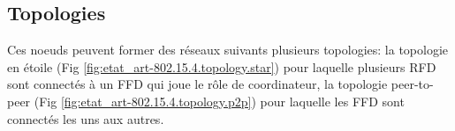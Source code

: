 \subsection{Topologies}\label{subsec:etat_art-802.15.4.topologies}
  Ces noeuds peuvent former des réseaux suivants plusieurs topologies: la topologie en étoile (Fig
  \ref{fig:etat_art-802.15.4.topology.star}) pour laquelle plusieurs RFD sont connectés à un FFD qui
  joue le rôle de coordinateur, la topologie peer-to-peer
  (Fig \ref{fig:etat_art-802.15.4.topology.p2p}) pour laquelle les FFD sont connectés les uns aux autres.
  \begin{figure}[H]
\end{figure}
